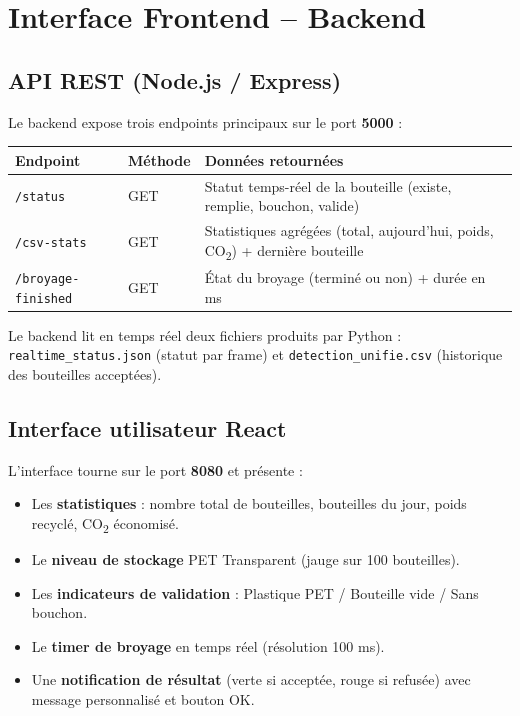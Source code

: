 \documentclass[11pt,a4paper]{article}
\begin{document}
\section{Interface Frontend -- Backend}

\subsection{API REST (Node.js / Express)}

Le backend expose trois endpoints principaux sur le port \textbf{5000} :

\begin{center}
\begin{tabular}{p{4cm} p{2cm} p{7cm}}
\toprule
\textbf{Endpoint} & \textbf{Méthode} & \textbf{Données retournées} \\
\midrule
\texttt{/status}           & GET & Statut temps-réel de la bouteille (existe, remplie, bouchon, valide) \\
\texttt{/csv-stats}        & GET & Statistiques agrégées (total, aujourd'hui, poids, CO\textsubscript{2}) + dernière bouteille \\
\texttt{/broyage-finished} & GET & État du broyage (terminé ou non) + durée en ms \\
\bottomrule
\end{tabular}
\end{center}

Le backend lit en temps réel deux fichiers produits par Python :
\texttt{realtime\_status.json} (statut par frame) et \texttt{detection\_unifie.csv}
(historique des bouteilles acceptées).

\subsection{Interface utilisateur React}

L'interface tourne sur le port \textbf{8080} et présente :

\begin{itemize}[noitemsep]
  \item Les \textbf{statistiques} : nombre total de bouteilles, bouteilles du jour,
        poids recyclé, CO\textsubscript{2} économisé.
  \item Le \textbf{niveau de stockage} PET Transparent (jauge sur 100 bouteilles).
  \item Les \textbf{indicateurs de validation} : Plastique PET / Bouteille vide / Sans bouchon.
  \item Le \textbf{timer de broyage} en temps réel (résolution 100 ms).
  \item Une \textbf{notification de résultat} (verte si acceptée, rouge si refusée)
        avec message personnalisé et bouton OK.
\end{itemize}
\end{document}
